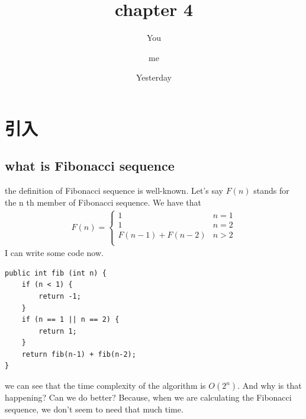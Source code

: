 \documentclass[a4paper, 10pt]{ctexart} %
\title{chapter 4}
\author{ You \and me}
\date{Yesterday}
\begin{document}
\maketitle
\tableofcontents
\section{引入}
\subsection{what is Fibonacci sequence}
the definition of Fibonacci sequence is well-known. Let's say $F \left(n\right) $ stands for the
n th member of Fibonacci sequence. We have that 
\begin{align*}
    F\left(n\right) = 
    \begin{cases}
        1 & n  =1 \\ 
        1 & n  = 2 \\
        F\left(n  -1\right) + F\left(n  -2\right)& n > 2 \\
    \end{cases}
\end{align*}
I can write some code now. 

\begin{verbatim}
public int fib (int n) {
    if (n < 1) {
        return -1;
    }
    if (n == 1 || n == 2) {
        return 1;
    }
    return fib(n-1) + fib(n-2);
}
\end{verbatim}
we can see that the time complexity of the algorithm is  $O \left( 2^{n}\right)$. 
And why is that happening? Can we do better? Because, when we are calculating the 
Fibonacci sequence, we don't seem to need that much time.
\end{document}

